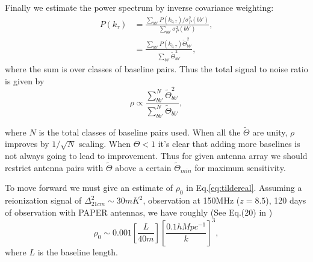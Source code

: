 \documentclass[preprint2,numberedappendix,tighten,twocolappendix]{aastex6}  %
\renewcommand\[{\begin{equation}}
\renewcommand\]{\end{equation}}
\begin{document}
Finally we estimate the power spectrum by inverse covariance weighting:
\begin{equation}
\begin{aligned}
 P(k_{\tau}) &= \frac{\sum_{bb'}P(k_{b,\tau})/\sigma_P^2(bb')}{\sum_{bb'}\sigma_P^2(bb')}, \\
 &= \frac{\sum_{bb'}P(k_{b,\tau})\widetilde{\Theta}_{bb'}^2}{\sum_{bb'}\widetilde{\Theta}_{bb'}^2},
 \end{aligned}
\end{equation}
where the sum is over classes of baseline pairs. 
Thus the total signal to noise ratio is given by
\begin{equation}
\rho \propto \frac{\sum_{bb'}^N\widetilde{\Theta}_{bb'}^2}{\sum_{bb'}^N\widetilde{\Theta}_{bb'}},
\end{equation}


where $N$ is the total classes of baseline pairs used. When all the $\widetilde{\Theta}$ are unity, $\rho$ improves by $1/\sqrt{N}$ scaling. When $\Theta<1$ it's clear that adding more baselines is not always going to lead to improvement. Thus for given antenna array we should restrict antenna pairs with $\widetilde{\Theta}$ above a certain $\widetilde{\Theta}_{min}$ for maximum sensitivity. 

To move forward we must give an estimate of $\rho_0$ in Eq.\ref{eq:tildereal}. Assuming a reionization signal of $\Delta_{21cm}^2\sim 30mK^2$, observation at 150MHz ($z=8.5$), 120 days of observation with PAPER antennas, we have roughly
(See Eq.(20) in \cite{first-paper})
\begin{equation}
\rho_0 \sim 0.001\left[\frac{L}{40m}\right] \left[\frac{0.1hMpc^{-1}}{k}\right]^3, 
\end{equation}
where $L$ is the baseline length. 

\end{document}
